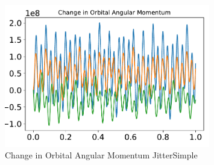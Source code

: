 \begin{figure}[htbp]\centerline{\includegraphics[width=0.80\textwidth]{AutoTeX/ChangeInOrbitalAngularMomentumJitterSimple}}\caption{Change in Orbital Angular Momentum JitterSimple}\label{fig:ChangeInOrbitalAngularMomentumJitterSimple}\end{figure}